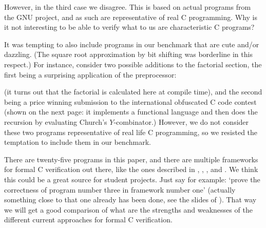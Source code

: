 \documentclass{article}
\begin{document}
However, in the third case we disagree.
This is based on actual programs from the GNU project,
and as such are representative of real C programming.
Why is it not interesting to be able to verify what
to us are characteristic C programs?

It was tempting to also include programs in our benchmark that are cute and/or dazzling.
(The square root approximation by bit shifting was borderline in this respect.)
For instance, consider two possible additions to the factorial
section,
the first being a surprising application of the preprocessor:


(it turns out that the factorial is calculated here at compile time),
and the second being a price winning submission to the international
obfuscated C code contest
(shown on the next page: it implements a functional language and then does the recursion by
evaluating Church's $Y$-combinator.)
However, we do not consider these two programs representative of
real life C programming, so we resisted the temptation to include them in our benchmark.

There are twenty-five programs in this paper, and there are multiple
frameworks for formal C verification out there, like the ones described
in \cite{app:11}, \cite{dah:mos:san:tob:sch:09}, \cite{gre:and:klei:12}, \cite{jac:sma:phi:vog:pen:pie:11} and \cite{mar:07}.
We think this could be a great source for student projects.
Just say for example: `prove the correctness of program number three in framework
number one' (actually something close to that one already has been done, see the slides of \cite{wie:16:1}).
That way we will get a good comparison of what are the strengths and
weaknesses of the different current approaches for formal C verification.



\end{document}
